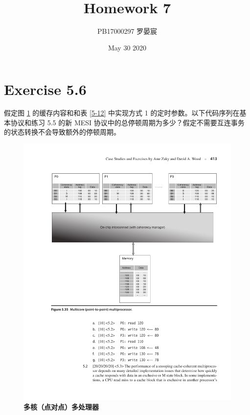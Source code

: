 \documentclass{article}
\title{Homework 7}
\author{PB17000297 罗晏宸}
\date{May 30 2020}
\begin{document}
\maketitle

\section{Exercise 5.6}
假定图 \ref{5-24} 的缓存内容和和表 \ref{5-12} 中实现方式 1 的定时参数。以下代码序列在基本协议和练习 5.5 的新 MESI 协议中的总停顿周期为多少？假定不需要互连事务的状态转换不会导致额外的停顿周期。
\begin{figure}[h]
    \centering
    \includegraphics[scale = 0.78]{Figure/5-24.pdf}
    \caption{\textbf{多核（点对点）多处理器}}
    \label{5-24}
\end{figure}
\end{document}

